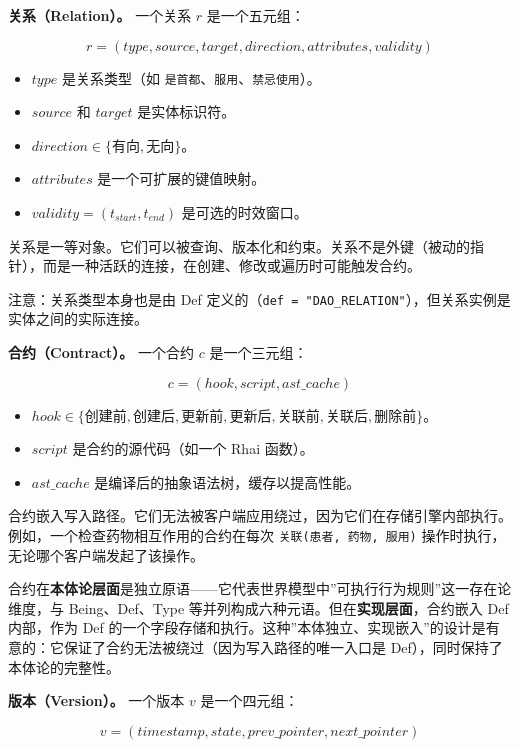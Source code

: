\documentclass[11pt,a4paper]{ctexart}
\begin{document}
\textbf{关系（Relation）。} 一个关系 \(r\) 是一个五元组：

\[r = (type, source, target, direction, attributes, validity)\]

\begin{itemize}
\tightlist
\item
  \(type\) 是关系类型（如
  \texttt{是首都}、\texttt{服用}、\texttt{禁忌使用}）。
\item
  \(source\) 和 \(target\) 是实体标识符。
\item
  \(direction \in \{\text{有向}, \text{无向}\}\)。
\item
  \(attributes\) 是一个可扩展的键值映射。
\item
  \(validity = (t_{start}, t_{end})\) 是可选的时效窗口。
\end{itemize}

关系是一等对象。它们可以被查询、版本化和约束。关系不是外键（被动的指针），而是一种活跃的连接，在创建、修改或遍历时可能触发合约。

注意：关系类型本身也是由 Def
定义的（\texttt{def\ =\ "DAO\_RELATION"}），但关系实例是实体之间的实际连接。

\textbf{合约（Contract）。} 一个合约 \(c\) 是一个三元组：

\[c = (hook, script, ast\_cache)\]

\begin{itemize}
\tightlist
\item
  \(hook \in \{\text{创建前}, \text{创建后}, \text{更新前}, \text{更新后}, \text{关联前}, \text{关联后}, \text{删除前}\}\)。
\item
  \(script\) 是合约的源代码（如一个 Rhai 函数）。
\item
  \(ast\_cache\) 是编译后的抽象语法树，缓存以提高性能。
\end{itemize}

合约嵌入写入路径。它们无法被客户端应用绕过，因为它们在存储引擎内部执行。例如，一个检查药物相互作用的合约在每次
\texttt{关联(患者,\ 药物,\ 服用)}
操作时执行，无论哪个客户端发起了该操作。

合约在\textbf{本体论层面}是独立原语------它代表世界模型中''可执行行为规则''这一存在论维度，与
Being、Def、Type 等并列构成六种元语。但在\textbf{实现层面}，合约嵌入 Def
内部，作为 Def
的一个字段存储和执行。这种''本体独立、实现嵌入''的设计是有意的：它保证了合约无法被绕过（因为写入路径的唯一入口是
Def），同时保持了本体论的完整性。

\textbf{版本（Version）。} 一个版本 \(v\) 是一个四元组：

\[v = (timestamp, state, prev\_pointer, next\_pointer)\]
\end{document}
